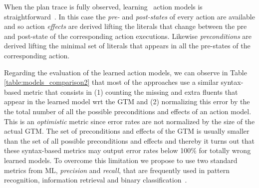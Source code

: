 When the plan trace is fully observed, learning \strips\ action models is straightforward~\cite{jimenez2012review}. In this case the {\em pre-} and {\em post-states} of every action are available and so action {\em effects} are derived lifting the literals that change between the pre and post-state of the corresponding action executions. Likewise {\em preconditions} are derived lifting the minimal set of literals that appears in all the pre-states of the corresponding action.





\vspace{0.1cm}
Regarding the evaluation of the learned action models, we can observe in Table \ref{table:models_comparison2} that most of the approaches use a similar syntax-based metric that consists in (1) counting the missing and extra fluents that appear in the learned model wrt the GTM and (2) normalizing this error by the the total number of all the possible preconditions and effects of an action model. This is an \emph{optimistic} metric since error rates are not normalized by the size of the actual GTM. The set of preconditions and effects of the GTM is usually smaller than the set of all possible preconditions and effects and thereby it turns out that these syntax-based metrics may output error rates below 100\% for totally wrong learned models. To overcome this limitation we propose to use two standard metrics from ML, {\em precision} and {\em recall}, that are frequently used in pattern recognition, information retrieval and binary classification~\cite{davis2006relationship}. %

